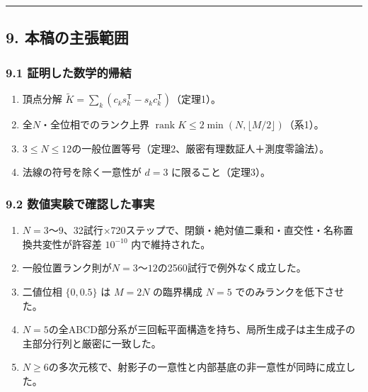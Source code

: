 \documentclass[
  a4paper,
]{ltjsarticle}
\providecommand{\tightlist}{%
  \setlength{\itemsep}{0pt}\setlength{\parskip}{0pt}}
\begin{document}
\begin{center}\rule{0.5\linewidth}{0.5pt}\end{center}

\subsection{9.
本稿の主張範囲}\label{ux672cux7a3fux306eux4e3bux5f35ux7bc4ux56f2}

\subsubsection{9.1
証明した数学的帰結}\label{ux8a3cux660eux3057ux305fux6570ux5b66ux7684ux5e30ux7d50}

\begin{enumerate}
\def\labelenumi{\arabic{enumi}.}
\tightlist
\item
  頂点分解
  \(\widetilde K=\sum_k(c_ks_k^{\mathsf T}-s_kc_k^{\mathsf T})\)（定理1）。
\item
  全\(N\)・全位相でのランク上界
  \(\operatorname{rank}K\le2\min(N,\lfloor M/2\rfloor)\)（系1）。
\item
  \(3\le N\le12\)の一般位置等号（定理2、厳密有理数証人＋測度零論法）。
\item
  法線の符号を除く一意性が \(d=3\) に限ること（定理3）。
\end{enumerate}

\subsubsection{9.2
数値実験で確認した事実}\label{ux6570ux5024ux5b9fux9a13ux3067ux78baux8a8dux3057ux305fux4e8bux5b9f}

\begin{enumerate}
\def\labelenumi{\arabic{enumi}.}
\tightlist
\item
  \(N=3\)〜\(9\)、32試行×720ステップで、閉鎖・絶対値二乗和・直交性・名称置換共変性が許容差
  \(10^{-10}\) 内で維持された。
\item
  一般位置ランク則が\(N=3\)〜\(12\)の2560試行で例外なく成立した。
\item
  二値位相 \(\{0,0.5\}\) は \(M=2N\) の臨界構成 \(N=5\)
  でのみランクを低下させた。
\item
  \(N=5\)の全ABCD部分系が三回転平面構造を持ち、局所生成子は主生成子の主部分行列と厳密に一致した。
\item
  \(N\ge6\)の多次元核で、射影子の一意性と内部基底の非一意性が同時に成立した。
\end{enumerate}
\end{document}
